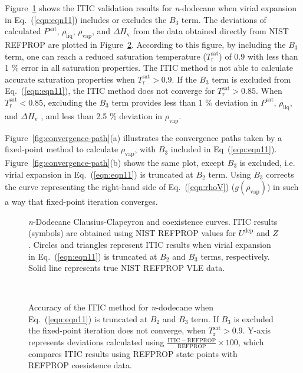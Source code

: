 \documentclass[5p,times]{elsarticle}
\begin{document}
Figure~\ref{fig:NIST-VALIDATION_C12_FTT} shows the ITIC validation results for \textit{n}-dodecane when virial expansion in Eq.~(\ref{eqn:eqn11}) includes or excludes the $B_{3}$ term. The deviations of calculated $P^{\mathrm{sat}}$, $\rho_{\mathrm{liq}}$, $\rho_{\mathrm{vap}}$, and $\Delta H_{\mathrm{v}}$ from the data obtained directly from NIST REFPROP \cite{Lemmon2004} are plotted in Figure~\ref{fig:Nist-Val-Deviation}. According to this figure, by including the $B_3$ term, one can reach a reduced saturation temperature ($T_\mathrm{r}^{\mathrm{sat}}$) of 0.9 with less than 1 \% error in all saturation properties. The ITIC method is not able to calculate accurate saturation properties when $T_\mathrm{r}^{\mathrm{sat}}>0.9$. If the $B_3$ term is excluded from Eq.~(\ref{eqn:eqn11}), the ITIC method does not converge for $T_\mathrm{r}^{\mathrm{sat}} > 0.85$. When $T_\mathrm{r}^{\mathrm{sat}} < 0.85$, excluding the $B_3$ term provides less than 1 \% deviation in $P^{\mathrm{sat}}$, $\rho_{\mathrm{liq}}$, and $\Delta H_{\mathrm{v}}$ , and less than 2.5 \% deviation in $\rho_{\mathrm{vap}}$.

Figure~\ref{fig:convergence-path}(a) illustrates the convergence paths taken by a fixed-point method to calculate $\rho_{\mathrm{vap}}$, with $B_3$ included in Eq~(\ref{eqn:eqn11}). Figure~\ref{fig:convergence-path}(b) shows the same plot, except $B_3$ is excluded, i.e. virial expansion in Eq.~(\ref{eqn:eqn11}) is truncated at $B_{2}$ term. Using $B_3$ corrects the curve representing the right-hand side of Eq.~(\ref{eqn:rhoV}) ($g(\rho_{\mathrm{vap}})$) in such a way that fixed-point iteration converges.

\begin{figure}
\centering
{}
\caption{\textit{n}-Dodecane Clausius-Clapeyron and coexistence curves. ITIC results (symbols) are obtained using NIST REFPROP \cite{Lemmon2004} values for $U^{\mathrm{dep}}$ and $Z$. Circles and triangles represent ITIC results when virial expansion in Eq.~(\ref{eqn:eqn11}) is truncated at $B_2$ and $B_3$ terms, respectively. Solid line represents true NIST REFPROP VLE data.
}
\label{fig:NIST-VALIDATION_C12_FTT}
\end{figure}


\begin{figure}
\centering
{}
\
\subfloat[]{\texttt{[image: Figures/Nist-Val-Deviation-Hvap.png]}}
\caption{
Accuracy of the ITIC method for \textit{n}-dodecane when Eq.~(\ref{eqn:eqn11}) is truncated at $B_2$ and $B_3$ term. If $B_3$ is excluded the fixed-point iteration does not converge, when $T_\mathrm{r}^{\mathrm{sat}}>0.9$. Y-axis represents deviations calculated using $\frac{\mathrm{ITIC - REFPROP}}{\mathrm{REFPROP}} \times 100$, which compares ITIC results using REFPROP state points with REFPROP coesistence data.
}
\label{fig:Nist-Val-Deviation}
\end{figure}
\end{document}
